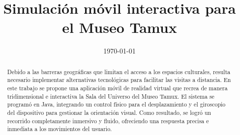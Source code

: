 \documentclass[conference]{IEEEtran}
\date{\specialdate\today}
\begin{document}
	
	\newcommand{\breite}{1.0} %
	\newcommand{\RelacionFiguradoscolumnas}{0.9}
	\newcommand{\RelacionFiguradoscolumnasPuntoCinco}{0.45}
	
	
	
	
	\title{Simulación móvil interactiva para el Museo Tamux}
	
		\author{
		}
		
		
		
		\maketitle
		
		\begin{abstract} 
			Debido a las barreras geográficas que limitan el acceso a los espacios culturales, resulta necesario implementar alternativas tecnológicas para facilitar las visitas a distancia. En este trabajo se propone una aplicación móvil de realidad virtual que recrea de manera tridimensional e interactiva la Sala del Universo del Museo Tamux. El sistema se programó en Java, integrando un control físico para el desplazamiento y el giroscopio del dispositivo para gestionar la orientación visual. Como resultado, se logró un recorrido completamente inmersivo y fluido, ofreciendo una respuesta precisa e inmediata a los movimientos del usuario.
			
		\end{abstract}
		
		
		
\end{document}
